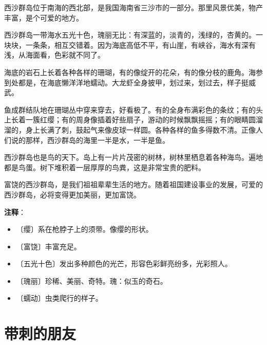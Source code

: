 \documentclass[12pt,UTF-8,openany]{ctexbook}
\begin{document}
\begin{large}
    
    西沙群岛位于南海的西北部，是我国海南省三沙市的一部分。那里风景优美，物产丰富，是个可爱的地方。
    
    西沙群岛一带海水五光十色，瑰丽无比：有深蓝的，淡青的，浅绿的，杏黄的。一块块，一条条，相互交错着。因为海底高低不平，有山崖，有峡谷，海水有深有浅，从海面看，色彩就不同了。
    
    海底的岩石上长着各种各样的珊瑚，有的像绽开的花朵，有的像分枝的鹿角。海参到处都是，在海底懒洋洋地蠕动。大龙虾全身披甲，划过来，划过去，样子挺威武。
    
    鱼成群结队地在珊瑚丛中穿来穿去，好看极了。有的全身布满彩色的条纹；有的头上长着一簇红缨；有的周身像插着好些扇子，游动的时候飘飘摇摇；有的眼睛圆溜溜的，身上长满了刺，鼓起气来像皮球一样圆。各种各样的鱼多得数不清。正像人们说的那样，西沙群岛的海里一半是水，一半是鱼。
    
    西沙群岛也是鸟的天下。岛上有一片片茂密的树林，树林里栖息着各种海鸟。遍地都是鸟蛋。树下堆积着一层厚厚的鸟粪，这是非常宝贵的肥料。
    
    富饶的西沙群岛，是我们祖祖辈辈生活的地方。随着祖国建设事业的发展，可爱的西沙群岛，必将变得更加美丽，更加富饶。
    
\end{large}


\newpage

\textbf{注释}：

\vspace{-1em}

\begin{itemize}
    \setlength\itemsep{-0.2em}
    \item 〔缨〕系在枪脖子上的须带。像缨的形状。
    \item 〔富饶〕丰富充足。
    \item 〔五光十色〕发出多种颜色的光芒，形容色彩鲜亮纷多，光彩照人。
    \item 〔瑰丽〕珍稀、美丽、奇特。瑰：似玉的奇石。
    \item 〔蠕动〕虫类爬行的样子。
\end{itemize}

\chapter{带刺的朋友}
\end{document}

